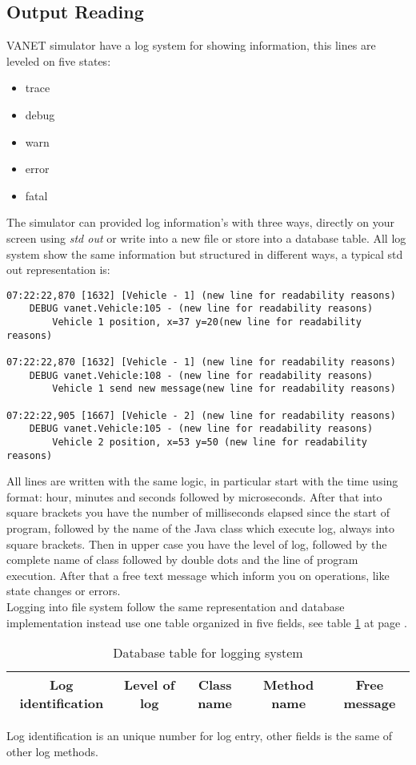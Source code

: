 \subsection{Output Reading}
VANET simulator have a log system for showing information, this lines are leveled on five states:
\begin{itemize}
	\item trace
	\item debug
	\item warn
	\item error
	\item fatal
\end{itemize}
The simulator can provided log  information's with three ways, directly on your screen using \textit{std out} or write into a new file or store into a database table. All log system show the same information but structured in different ways, a typical std out representation is:
\begin{verbatim}
07:22:22,870 [1632] [Vehicle - 1] (new line for readability reasons)
	DEBUG vanet.Vehicle:105 - (new line for readability reasons)
		Vehicle 1 position, x=37 y=20(new line for readability reasons)
		
07:22:22,870 [1632] [Vehicle - 1] (new line for readability reasons)
	DEBUG vanet.Vehicle:108 - (new line for readability reasons)
		Vehicle 1 send new message(new line for readability reasons)
		
07:22:22,905 [1667] [Vehicle - 2] (new line for readability reasons)
	DEBUG vanet.Vehicle:105 - (new line for readability reasons)
		Vehicle 2 position, x=53 y=50 (new line for readability reasons)
\end{verbatim}
All lines are written with the same logic, in particular start with the time using format: hour, minutes and seconds followed by microseconds. After that into square brackets you have the number of milliseconds elapsed since the start of program, followed by the name of the Java class which execute log, always into square brackets. Then in upper case you have the level of log, followed by the complete name of class followed by double dots and the line of program execution. After that a free text message which inform you on operations, like state changes or errors.\\
Logging into file system follow the same representation and database implementation instead use one table organized in five fields, see table \ref{tab:DBLog} at page \pageref{tab:DBLog}.
\begin{table}[!ht]
	\centering
	\caption{Database table for logging system}
	\begin{tabular}{|c|c|c|c|c|}
	\hline\hline 
	\textbf{Log identification} & \textbf{Level of log} & \textbf{Class name} & \textbf{Method name} & \textbf{Free message}\\
	\hline
	\hline     %
 	\end{tabular} 
	\label{tab:DBLog}
\end{table}
Log identification is an unique number for log entry, other fields is the same of other log methods.
